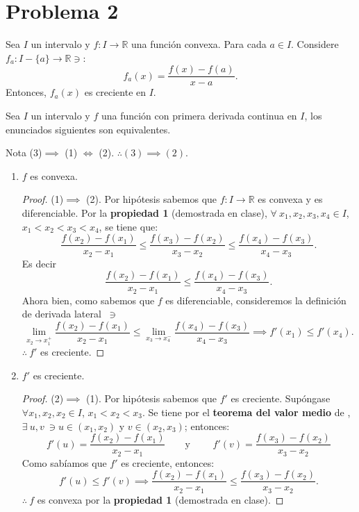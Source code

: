 \section{Problema 2}
\begin{tcolorbox}[colback=gray!15,colframe=gray!1!gray,title= Propiedad 1 ]
	Sea $I$ un intervalo  y $f:I\to \mathbb{R}$ una función convexa. Para cada $a\in I$. Considere $f_a: I-\{a\}\to \mathbb{R}\ni $: 
	$$f_a(x)=\frac{f(x)-f(a)}{x-a}.$$
	Entonces, $f_a(x)$ es creciente en $I$. 
\end{tcolorbox}
Sea $I$ un intervalo y $f$ una función con primera derivada continua en $I$, los enunciados siguientes son equivalentes. 
\begin{noter} {Nota}
	(3)$\implies$ (1) $\iff$ (2). $\therefore (3) \implies (2)$.
\end{noter}
\begin{enumerate}
	\item $f$ es convexa. 
	\begin{proof}
		(1)$\implies$ (2). Por hipótesis sabemos que $f:I\to\mathbb{R}$ es convexa y es diferenciable. Por la \textbf{propiedad 1} (demostrada en clase), $\forall \ x_1,x_2,x_3,x_4\in I$, $x_1<x_2<x_3<x_4$, se tiene que: 
		$$\frac{f(x_2)-f(x_1)}{x_2-x_1}\leq \frac{f(x_3)-f(x_2)}{x_3-x_2}\leq \frac{f(x_4)-f(x_3)}{x_4-x_3} .$$
		Es decir
		$$\frac{f(x_2)-f(x_1)}{x_2-x_1}\leq\frac{f(x_4)-f(x_3)}{x_4-x_3}.$$
		Ahora bien, como sabemos que $f$ es diferenciable, consideremos la definición de derivada lateral $\ \ni $
		$$\lim_{x_2\to x_1^+}\frac{f(x_2)-f(x_1)}{x_2-x_1}\leq\lim_{x_3\to x_4^-}\frac{f(x_4)-f(x_3)}{x_4-x_3}\implies f'(x_1)\leq f'(x_4).$$
		$\therefore \ f'$ es creciente. 
	\end{proof}






	\item $f'$ es creciente. 
		\begin{proof}
		(2)$\implies$ (1). Por hipótesis sabemos que $f'$ es creciente. Supóngase  $\forall x_1,x_2,x_2\in I$, $x_1<x_2<x_3$. Se tiene por el \textbf{teorema del valor medio} de \cite{bartle2000introduction}, $\exists \ u, v \ \ni u\in (x_1,x_2)$ y $v\in (x_2,x_3)$; entonces: 
		$$f'(u)=\frac{f(x_2)-f(x_1)}{x_2-x_1}\qquad \text{y } \qquad f'(v)=\frac{f(x_3)-f(x_2)}{x_3-x_2} $$   
		Como sabíamos que $f'$ es creciente, entonces: 
		$$f'(u)\leq f'(v)\implies \frac{f(x_2)-f(x_1)}{x_2-x_1} \leq\frac{f(x_3)-f(x_2)}{x_3-x_2} .$$
		$\therefore \ f$ es convexa por la \textbf{propiedad 1} (demostrada en clase).  
	\end{proof}





\end{enumerate}
